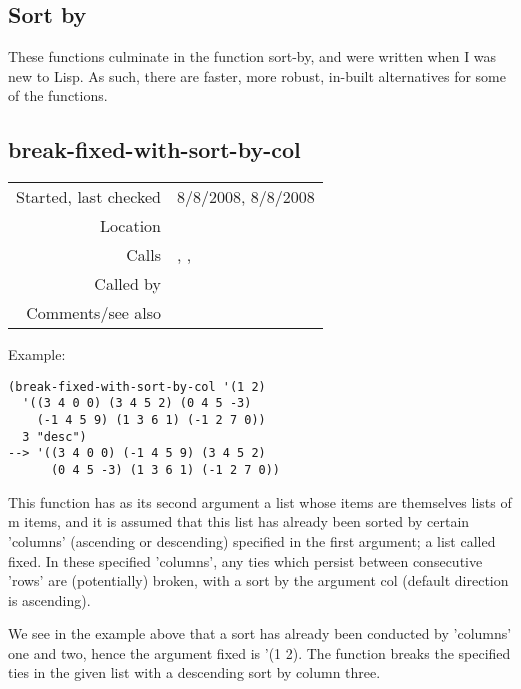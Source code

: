 \subsection{Sort by}\label{sec:sort-by}

\noindent These functions culminate in the function
sort-by, and were written when I was new to Lisp. As
such, there are faster, more robust, in-built
alternatives for some of the functions.


\subsection*{break-fixed-with-sort-by-col}\label{fun:break-fixed-with-sort-by-col}

\vspace{0.3cm}
\begin{tabular}{r|p{8cm}}
Started, last checked & 8/8/2008, 8/8/2008 \\
Location & \nameref{sec:sort-by} \\
Calls & \nameref{fun:lastn}, \nameref{fun:rows-with-fixed-same-as-1st-row},\newline \nameref{fun:sort-by-col} \\
Called by & \nameref{fun:sort-by} \\
Comments/see also & 
\end{tabular}

\vspace{0.5cm}
\noindent Example:
\begin{verbatim}
(break-fixed-with-sort-by-col '(1 2)
  '((3 4 0 0) (3 4 5 2) (0 4 5 -3)
    (-1 4 5 9) (1 3 6 1) (-1 2 7 0))
  3 "desc")
--> '((3 4 0 0) (-1 4 5 9) (3 4 5 2)
      (0 4 5 -3) (1 3 6 1) (-1 2 7 0))
\end{verbatim}

\noindent This function has as its second argument a
list whose items are themselves lists of m items, and
it is assumed that this list has already been sorted
by certain 'columns' (ascending or descending)
specified in the first argument; a list called fixed.
In these specified 'columns', any ties which persist
between consecutive 'rows' are (potentially) broken,
with a sort by the argument col (default direction is
ascending).

We see in the example above that a sort has already
been conducted by 'columns' one and two, hence the
argument fixed is '(1 2). The function breaks the
specified ties in the given list with a descending
sort by column three.


